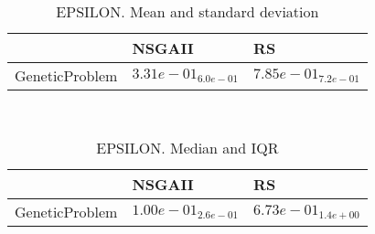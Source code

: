 \documentclass{article}
\begin{document}
\
\begin{table}
\caption{EPSILON. Mean and standard deviation}
\label{table:mean.EPSILON}
\centering
\begin{scriptsize}
\begin{tabular}{lll}
\hline & NSGAII &  RS\\
\hline
GeneticProblem & \cellcolor{gray95}$  3.31e-01_{ 6.0e-01}$ & $  7.85e-01_{ 7.2e-01}$ \\
\hline
\end{tabular}
\end{scriptsize}
\end{table}
\
\begin{table}
\caption{EPSILON. Median and IQR}
\label{table:median.EPSILON}
\begin{scriptsize}
\centering
\begin{tabular}{lll}
\hline & NSGAII &  RS\\
\hline
GeneticProblem & \cellcolor{gray95}$  1.00e-01_{ 2.6e-01}$ & $  6.73e-01_{ 1.4e+00}$ \\
\hline
\end{tabular}
\end{scriptsize}
\end{table}
\end{document}
